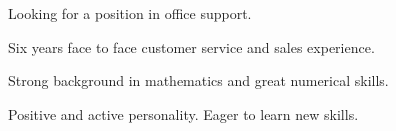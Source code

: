 

\begin{cventries}

  \cventry
    {} %
    {} %
    {} %
    {} %
    {
      \begin{cvitems} %
      \item Looking for a position in office support.
      \item Six years face to face customer service and sales experience.
      \item Strong background in mathematics and great numerical skills.
      \item Positive and active personality.  Eager to learn new skills.
      \end{cvitems}
    }


\end{cventries}
